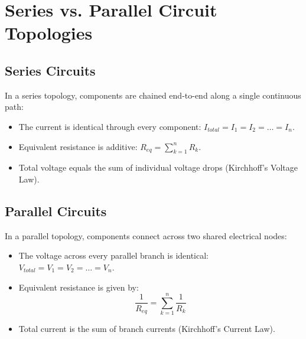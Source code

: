 \section{Series vs. Parallel Circuit Topologies}

\subsection{Series Circuits}
In a series topology, components are chained end-to-end along a single continuous path:
\begin{itemize}[leftmargin=1.5em]
    \item The current is identical through every component: $I_{total} = I_1 = I_2 = \dots = I_n$.
    \item Equivalent resistance is additive: $R_{eq} = \sum_{k=1}^n R_k$.
    \item Total voltage equals the sum of individual voltage drops (Kirchhoff's Voltage Law).
\end{itemize}

\subsection{Parallel Circuits}
In a parallel topology, components connect across two shared electrical nodes:
\begin{itemize}[leftmargin=1.5em]
    \item The voltage across every parallel branch is identical: $V_{total} = V_1 = V_2 = \dots = V_n$.
    \item Equivalent resistance is given by:
    \begin{equation}
        \frac{1}{R_{eq}} = \sum_{k=1}^n \frac{1}{R_k}
    \end{equation}
    \item Total current is the sum of branch currents (Kirchhoff's Current Law).
\end{itemize}
